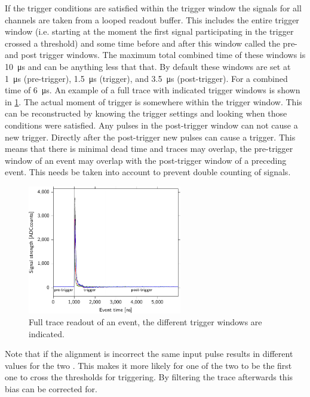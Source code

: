If the trigger conditions are satisfied within the trigger window the \pmt signals for all channels are taken from a looped readout buffer. This includes the entire trigger window (i.e. starting at the moment the first signal participating in the trigger crossed a threshold) and some time before and after this window called the pre- and post trigger windows. The maximum total combined time of these windows is \SI{10}{\micro\second} and can be anything less that that. By default these windows are set at \SI{1}{\micro\second} (pre-trigger), \SI{1.5}{\micro\second} (trigger), and \SI{3.5}{\micro\second} (post-trigger). For a combined time of \SI{6}{\micro\second}. An example of a full trace with indicated trigger windows is shown in \cref{fig:trigger_windows}. The actual moment of trigger is somewhere within the trigger window. This can be reconstructed by knowing the trigger settings and looking when those conditions were satisfied. Any pulses in the post-trigger window can not cause a new trigger. Directly after the post-trigger new pulses can cause a trigger. This means that there is minimal dead time and traces may overlap, the pre-trigger window of an event may overlap with the post-trigger window of a preceding event. This needs be taken into account to prevent double counting of signals.

\begin{figure}
    \centering
    \includegraphics[width=0.6\textwidth]
                    {plots/station/trace_501_1443743701_102112574}
    \caption{Full trace readout of an event, the different trigger windows are indicated.}
    \label{fig:trigger_windows}
\end{figure}

Note that if the \adc alignment is incorrect the same input pulse results in different \adc values for the two \adcs. This makes it more likely for one of the two \adcs to be the first one to cross the thresholds for triggering. By filtering the trace afterwards this bias can be corrected for.


